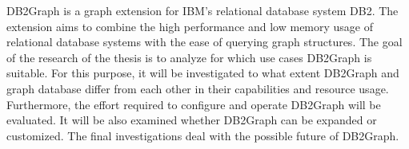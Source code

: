 DB2Graph is a graph extension for IBM's relational database system DB2. The extension aims to combine the high performance and low memory usage of relational database systems with the ease of querying graph structures. The goal of the research of the thesis is to analyze for which use cases DB2Graph is suitable. For this purpose, it will be investigated to what extent DB2Graph and graph database differ from each other in their capabilities and resource usage. Furthermore, the effort required to configure and operate DB2Graph will be evaluated. It will be also examined whether DB2Graph can be expanded or customized. The final investigations deal with the possible future of DB2Graph.